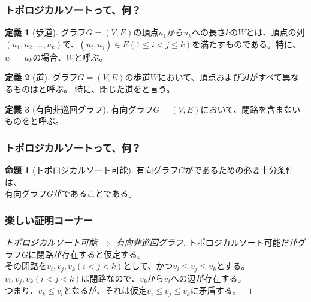 \documentclass[aspectratio=169,dvipdfmx,12pt,notheorems]{beamer}
\theoremstyle{definition}
\newtheorem{definition}{定義}
\newtheorem{proposition}{命題}
\begin{document}
\begin{frame}\frametitle{トポロジカルソートって、何？}

\begin{definition}[歩道]
グラフ$G=(V, E)$の頂点$u_{1}$から$u_{k}$への長さ$k$の$W$とは、頂点の列$(u_{1}, u_{2}, \dots, u_{k})$で、$(u_{i}, u_{j}) \in E (1 \leq i < j \leq k)$を満たすものである。特に、$u_{1}=u_{k}$の場合、$W$と呼ぶ。
\end{definition}

\begin{definition}[道]
グラフ$G=(V, E)$の歩道$W$において、頂点および辺がすべて異なるものはと呼ぶ。
特に、閉じた道をと言う。
\end{definition}

\begin{definition}[有向非巡回グラフ]
有向グラフ$G=(V, E)$において、閉路を含まないものをと呼ぶ。
\end{definition}

\end{frame}

\begin{frame}\frametitle{トポロジカルソートって、何？}

\begin{proposition}[トポロジカルソート可能]
有向グラフ$G$がであるための必要十分条件は、\\ 有向グラフ$G$がであることである。
\end{proposition}

\end{frame}

\begin{frame}\frametitle{楽しい証明コーナー}

\begin{proof}[トポロジカルソート可能 $\Rightarrow$ 有向非巡回グラフ]
トポロジカルソート可能だがグラフ$G$に閉路が存在すると仮定する。 \\
その閉路を$v_{i}, v_{j}, v_{k}(i < j < k)$として、かつ$ v_{i} \leq v_{j} \leq v_{k}$とする。
$v_{i}, v_{j}, v_{k}(i < j < k)$は閉路なので、$v_{k}$から$v_{i}$への辺が存在する。 \\
つまり、$v_{k} \leq v_{i}$となるが、それは仮定$ v_{i} \leq v_{j} \leq v_{k}$に矛盾する。
\end{proof}

\end{frame}
\end{document}

